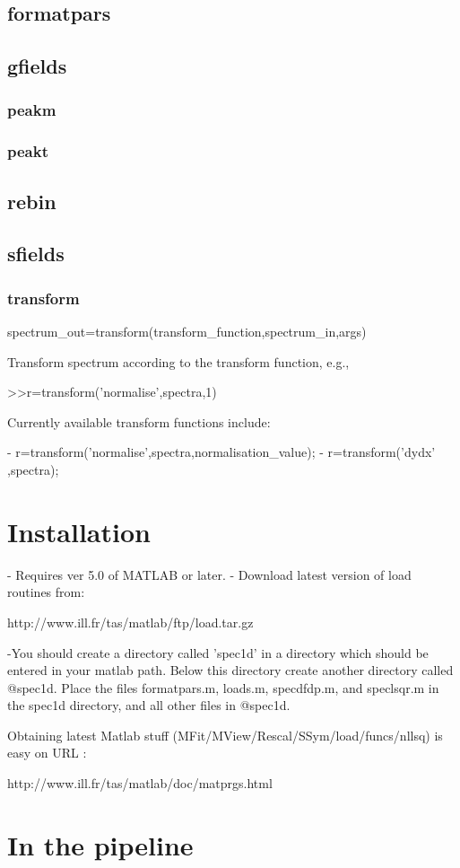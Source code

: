 \documentclass[a4paper]{article}
\begin{document}
\subsection{formatpars}

\subsection{gfields}

\subsubsection{peakm}

\subsubsection{peakt}

\subsection{rebin}

\subsection{sfields}

\subsubsection{transform}

spectrum_out=transform(transform_function,spectrum_in,args)

Transform spectrum according to the transform function, e.g.,

>>r=transform('normalise',spectra,1)
 
Currently available transform functions include:

- r=transform('normalise',spectra,normalisation_value);
- r=transform('dydx'     ,spectra);


\section{Installation}

- Requires ver 5.0 of MATLAB or later.
- Download latest version of load routines from:

http://www.ill.fr/tas/matlab/ftp/load.tar.gz

-You should create a directory called 'spec1d' in a directory which
should be entered in your matlab path. Below this directory create
another directory called @spec1d. Place the files formatpars.m,
loads.m, specdfdp.m, and speclsqr.m in the spec1d directory, and
all other files in @spec1d.

Obtaining latest Matlab stuff (MFit/MView/Rescal/SSym/load/funcs/nllsq)
is easy on URL :

http://www.ill.fr/tas/matlab/doc/matprgs.html

\section{In the pipeline}
\end{document}
